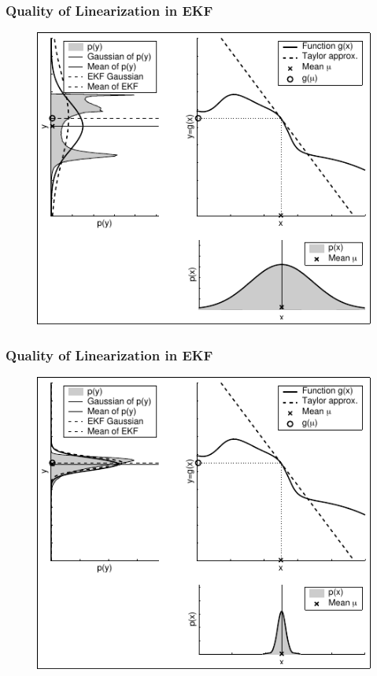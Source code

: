     
    \begin{frame}
     \frametitle{Quality of Linearization in EKF}
    
     \begin{figure}[!h]
     \includegraphics[width=0.5\columnwidth]{./images/dependency_approximation_quality_spread.pdf}
     \end{figure}
    \end{frame}
    
    \begin{frame}
     \frametitle{Quality of Linearization in EKF}
    
     \begin{figure}[!h]
    \includegraphics[width=0.5\columnwidth]{./images/dependency_approximation_quality_narrow.pdf}
    \end{figure}
    \end{frame}
    
